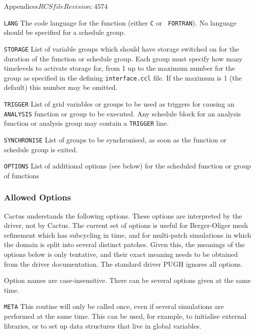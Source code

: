 \begin{cactuspart}{Appendices}{$RCSfile$}{$Revision: 4574 $}
\begin{Lentry}
  \item[{\tt LANG}] The code language for the function (either {\tt C} or {\tt
    FORTRAN}). No language should be specified for a schedule group.

  \item[{\tt STORAGE}] List of variable groups which should have storage
  switched on for the duration of the function or schedule group.
  Each group must specify how many timelevels to activate storage for,
  from 1 up to the maximum number for the group as specified in the
  defining {\tt interface.ccl} file. If the maximum is 1 (the default)
  this number may be omitted.

  \item[{\tt TRIGGER}] List of grid variables or groups to be used as
  triggers for causing an {\tt ANALYSIS} function or group to be
  executed.  Any schedule block for an analysis function or analysis
  group may contain a {\tt TRIGGER} line.

  \item[{\tt SYNCHRONISE}] List of groups to be synchronised, as soon
    as the function or schedule group is exited.

  \item[{\tt OPTIONS}] List of additional options (see below) for the scheduled function or group of functions

\end{Lentry}

\subsubsection{Allowed Options}

\label{app:allopts}

Cactus understands the following options.  These options are
interpreted by the driver, not by Cactus.  The current set of options
is useful for Berger-Oliger mesh refinement which has subcycling in
time, and for multi-patch simulations in which the domain is split
into several distinct patches.  Given this, the meanings of the
options below is only tentative, and their exact meaning needs to be
obtained from the driver documentation.  The standard driver PUGH
ignores all options.

Option names are case-insensitive.  There can be several options given
at the same time.

\begin{Lentry}
  
\item[{\tt META}] This routine will only be called once, even if
  several simulations are performed at the same time.  This can be
  used, for example, to initialise external libraries, or to set up
  data structures that live in global variables.
  

\end{Lentry}
\end{cactuspart}
